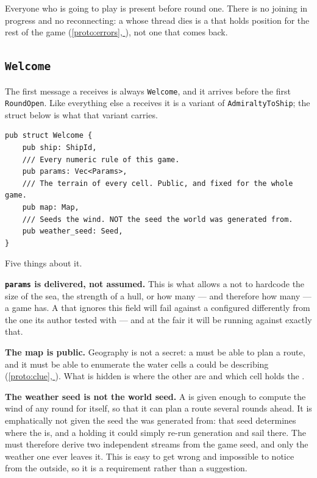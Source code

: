 \documentclass{article}
\newcommand{\fullref}[1]{\hyperref[#1]{\cref*{#1}, \nameref*{#1}}}
\begin{document}
Everyone who is going to play is present before round one. There is no joining in progress and no
reconnecting: a \ship{} whose thread dies is a \ship{} that holds position for the rest of the game
(\fullref{proto:errors}), not one that comes back.

\subsection{\texttt{Welcome}}

The first message a \ship{} receives is always \texttt{Welcome}, and it arrives before the first
\texttt{RoundOpen}. Like everything else a \ship{} receives it is a variant of
\texttt{AdmiraltyToShip}; the struct below is what that variant carries.

\begin{lstlisting}
pub struct Welcome {
    pub ship: ShipId,
    /// Every numeric rule of this game.
    pub params: Vec<Params>,
    /// The terrain of every cell. Public, and fixed for the whole game.
    pub map: Map,
    /// Seeds the wind. NOT the seed the world was generated from.
    pub weather_seed: Seed,
}
\end{lstlisting}

Five things about it.

\textbf{\texttt{params} is delivered, not assumed.} This is what allows a \ship{} not to hardcode
the size of the sea, the strength of a hull, or how many \islands{} --- and therefore how many
\clues{} --- a game has. A \ship{} that
ignores this field will fail against a \chart{} configured differently from the one its author
tested with --- and at the fair it will be running against exactly that.

\textbf{The map is public.} Geography is not a secret: a \ship{} must be able to plan a route, and
it must be able to enumerate the water cells a \clue{} could be describing (\fullref{proto:clue}).
What is hidden is where the other \ships are and which cell holds the \treasure{}.

\textbf{The weather seed is not the world seed.} A \ship{} is given enough to compute the wind of
any round for itself, so that it can plan a route several rounds ahead. It is emphatically not given
the seed the \archipelago{} was generated from: that seed determines where the \treasure{} is, and a
\ship{} holding it could simply re-run generation and sail there. The \chart{} must therefore derive
two independent streams from the game seed, and only the weather one ever leaves it. This is easy to
get wrong and impossible to notice from the outside, so it is a requirement rather than a
suggestion.
\end{document}
